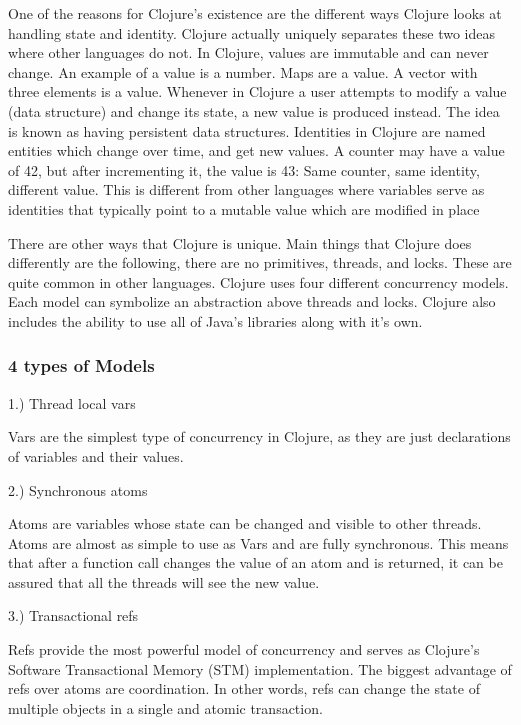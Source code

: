     One of the reasons for Clojure's existence are the different ways Clojure looks at handling state and identity. Clojure actually uniquely separates these two ideas where other languages do not. In Clojure, values are immutable and can never change. An example of a value is a number. Maps are a value. A vector with three elements is a value. Whenever in Clojure a user attempts to modify a value (data structure) and change its state, a new value is produced instead. The idea is known as having persistent data structures. Identities in Clojure are named entities which change over time, and get new values. A counter may have a value of 42, but after incrementing it, the value is 43: Same counter, same identity, different value. This is different from other languages where variables serve as identities that typically point to a mutable value which are modified in place
        \cite{website:clojure-lang-reference}
    
    There are other ways that Clojure is unique. Main things that Clojure does differently are the following, there are no primitives, threads, and locks. These are quite common in other languages. Clojure uses four different concurrency models. Each model can symbolize an abstraction above threads and locks. Clojure also includes the ability to use all of Java's libraries along with it's own.
    
    \subsubsection{4 types of Models}
    
    1.) Thread local vars
    
        Vars are the simplest type of concurrency in Clojure, as they are just declarations of variables and their values. 
    
    2.) Synchronous atoms
    
        Atoms are variables whose state can be changed and visible to other threads. Atoms are almost as simple to use as Vars and are fully synchronous. This means that after a function call changes the value of an atom and is returned, it can be assured that all the threads will see the new value.
         
    3.) Transactional refs
    
        Refs provide the most powerful model of concurrency and serves as Clojure's Software Transactional Memory (STM) implementation. The biggest advantage of refs over atoms are coordination. In other words, refs can change the state of multiple objects in a single and atomic transaction.   
        
